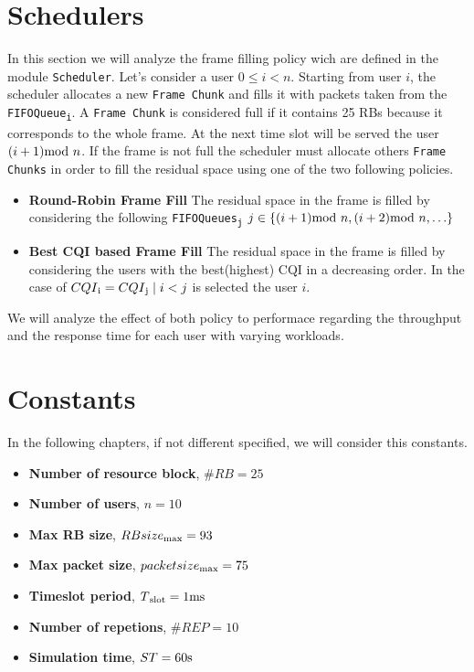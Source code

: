 \section{Schedulers}
  In this section we will analyze the frame filling policy wich are defined in the module \texttt{Scheduler}.
  Let's consider a user \(0\leq i < n\). Starting from user \(i\), the scheduler allocates a new \texttt{Frame Chunk} and fills it with packets taken from the \texttt{FIFOQueue\textsubscript{i}}. A \texttt{Frame Chunk} is considered full if it contains 25 RBs because it corresponds to the whole frame. At the next time slot will be served the user \((i+1)\textnormal{mod }n\). If the frame is not full the scheduler must allocate others \texttt{Frame Chunks} in order to fill the residual space using one of the two following policies. 

\begin{itemize}
  \item \textbf{Round-Robin Frame Fill}
  The residual space  in the frame is filled by considering the following \texttt{FIFOQueues\textsubscript{j}} \(j \in \{ (i+1)\textnormal{mod } n,(i+2)\textnormal{mod }n,\ldots \} \)
  \item \textbf{Best CQI based Frame Fill}
   The residual space in the frame is filled by considering the users with the best(highest) CQI in a decreasing order. In the case of \(CQI\textsubscript{i}=CQI\textsubscript{j} \mid i < j\) is selected the user \(i\).
\end{itemize}
We will analyze the effect of both policy to performace regarding the throughput and the response time for each user with varying workloads.

\section{Constants}
In the following chapters, if not different specified, we will consider this constants.
\begin{itemize}
\item \textbf{Number of resource block}, \(\#RB = 25\)
\item \textbf{Number of users}, \(n = 10\)
\item \textbf{Max RB size}, \(RBsize\textsubscript{max} = 93\)
\item \textbf{Max packet size}, \(packetsize\textsubscript{max} = 75\)
\item \textbf{Timeslot period}, \(T\textsubscript{slot} = 1\textnormal{ms}\)
\item \textbf{Number of repetions}, \(\#REP = 10\)
\item \textbf{Simulation time}, \(ST = 60 \textnormal{s}\)
\end{itemize}